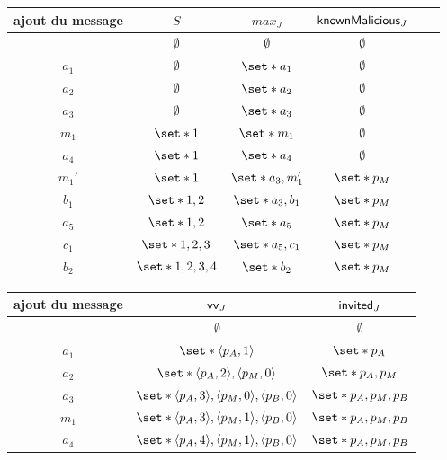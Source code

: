 \begin{table}[ht]
    \begin{subtable}{\linewidth}
    \centering
    \begin{tabular}{cccccc}
        ajout du message & $S$ & $max_J$ & $\operatorname{\mathsf{knownMalicious}}_J$ \\
        \toprule
        & $\emptyset$ & $\emptyset$ & $\emptyset$ \\
        $a_1$ & $\emptyset$ & $\set*{a_1}$ & $\emptyset$ \\
        $a_2$ & $\emptyset$ & $\set*{a_2}$ & $\emptyset$ \\
        $a_3$ & $\emptyset$ & $\set*{a_3}$ & $\emptyset$ \\
        $m_1$ & $\set*{1}$ & $\set*{m_1}$ & $\emptyset$ \\
        $a_4$ & $\set*{1}$ & $\set*{a_4}$ & $\emptyset$ \\
        $m_1'$ & $\set*{1}$ & $\set*{a_3,m_1'}$ & $\set*{p_M}$ \\
        $b_1$ & $\set*{1,2}$ & $\set*{a_3,b_1}$ & $\set*{p_M}$ \\
        $a_5$ & $\set*{1,2}$ & $\set*{a_5}$ & $\set*{p_M}$ \\
        $c_1$ & $\set*{1,2,3}$ & $\set*{a_5,c_1}$ & $\set*{p_M}$ \\
        $b_2$ & $\set*{1,2,3,4}$ & $\set*{b_2}$ & $\set*{p_M}$ \\
    \end{tabular}
    \end{subtable}
    \par\smallskip
    \begin{subtable}{\linewidth}
    \centering
    \begin{tabular}{ccc}
        ajout du message & $\operatorname{\mathsf{vv}}_J$ & $\operatorname{\mathsf{invited}}_J$ \\
        \toprule
        & $\emptyset$ & $\emptyset$\\
        $a_1$ & $\set*{\tuple*{p_A, 1}}$ & $\set*{p_A}$ \\
        $a_2$ & $\set*{\tuple*{p_A, 2}, \tuple*{p_M, 0}}$ & $\set*{p_A,p_M}$ \\
        $a_3$ & $\set*{\tuple*{p_A, 3},\tuple*{p_M, 0},\tuple*{p_B, 0}}$ & $\set*{p_A,p_M,p_B}$ \\
        $m_1$ & $\set*{\tuple*{p_A, 3}, \tuple*{p_M, 1}, \tuple*{p_B, 0}}$ & $\set*{p_A,p_M,p_B}$ \\
        $a_4$ & $\set*{\tuple*{p_A, 4}, \tuple*{p_M, 1}, \tuple*{p_B, 0}}$ & $\set*{p_A,p_M,p_B}$ \\

\end{tabular}
\end{subtable}
\end{table}
